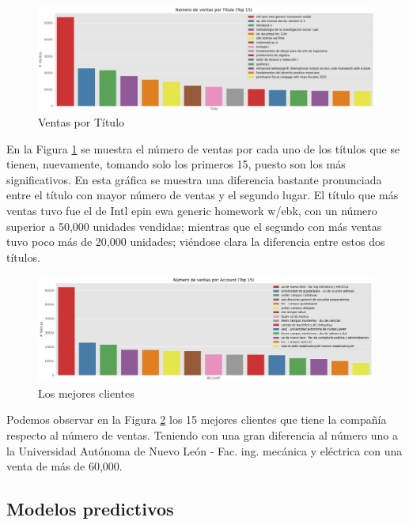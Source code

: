 \documentclass{article}
\begin{document}
        \begin{figure}[h!]
            \centering
            \includegraphics[width = \columnwidth]{img/num_sales_title.png}
            \caption{Ventas por Título}
            \label{fig:ventTítulo}
        \end{figure}

        En la Figura \ref{fig:ventTítulo} se muestra el número de ventas por cada uno de los títulos que se tienen, nuevamente, tomando solo los primeros 15, puesto son los más significativos. En esta gráfica se muestra una diferencia bastante pronunciada entre el título con mayor número de ventas y el segundo lugar. El título que más ventas tuvo fue el de Intl epin ewa generic homework w/ebk, con un número superior a 50,000 unidades vendidas; mientras que el segundo con más ventas tuvo poco más de 20,000 unidades; viéndose clara la diferencia entre estos dos títulos.

        \begin{figure}[h!]
            \centering
            \includegraphics[width = \columnwidth]{img/sales_account.png}
            \caption{Los mejores clientes}
            \label{fig:ventClientes}
        \end{figure}

        Podemos observar en la Figura \ref{fig:ventClientes} los 15 mejores clientes que tiene la compañía respecto al número de ventas. Teniendo con una gran diferencia al número uno a la Universidad Autónoma de Nuevo León - Fac. ing. mecánica y eléctrica con una venta de más de 60,000.

        \newpage

        \subsection{Modelos predictivos}
\end{document}
